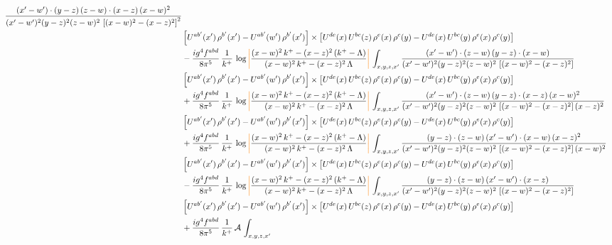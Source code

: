 \documentclass[9pt]{article}
\numberwithin{equation}{section}
\begin{document}
\begin{align}
\frac{(x'-w')\cdot(y-z)\,(z-w)\cdot(x-z)\,(x-w)^{2}}{(x'-w')^{2}(y-z)^{2}(z-w)^{2}\,\left[(x-w)^{2}-(x-z)^{2}\right]^{2}}\notag \\ 
&\left[U^{ab'}(x')\,\rho^{b'}(x')-U^{ab'}(w')\, \rho^{b'}(x')\right]\times \left[U^{de}(x)\,U^{bc}(z)\, \rho^{e}(x)\,\rho^{c}(y)-U^{de}(x)\,U^{bc}(y)\,\rho^{e}(x)\,\rho^{c}(y)\right]\notag \\ & -\frac{ig^{4}f^{abd}}{8\pi^{5}}\,\frac{1}{k^{+}}\,\log{\textcolor{orange}{\left|\textcolor{black}{\frac{(x-w)^{2}\,k^{+}-(x-z)^{2}\,(k^{+}-\Lambda)}{(x-w)^{2}\,k^{+}-(x-z)^{2}\,\Lambda}}\right|}}\,\int_{x,y,z,x'}
\frac{(x'-w')\cdot(z-w)\,(y-z)\cdot(x-w)}{(x'-w')^{2}(y-z)^{2}(z-w)^{2}\,\left[(x-w)^{2}-(x-z)^{2}\right]}\notag \\ & \left[U^{ab'}(x')\,\rho^{b'}(x')-U^{ab'}(w')\, \rho^{b'}(x')\right]\times \left[U^{de}(x)\,U^{bc}(z)\, \rho^{e}(x)\,\rho^{c}(y)-U^{de}(x)\,U^{bc}(y)\,\rho^{e}(x)\,\rho^{c}(y)\right]\notag \\ &  +\frac{ig^{4}f^{abd}}{8\pi^{5}}\,\frac{1}{k^{+}}\,\log{\textcolor{orange}{\left|\textcolor{black}{\frac{(x-w)^{2}\,k^{+}-(x-z)^{2}\,(k^{+}-\Lambda)}{(x-w)^{2}\,k^{+}-(x-z)^{2}\,\Lambda}}\right|}}\,\int_{x,y,z,x'}
\frac{(x'-w')\cdot(z-w)\,(y-z)\cdot(x-z)\,(x-w)^{2}}{(x'-w')^{2}(y-z)^{2}(z-w)^{2}\,\left[(x-w)^{2}-(x-z)^{2}\right](x-z)^{2}}\notag \\ & \left[U^{ab'}(x')\,\rho^{b'}(x')-U^{ab'}(w')\, \rho^{b'}(x')\right]\times \left[U^{de}(x)\,U^{bc}(z)\, \rho^{e}(x)\,\rho^{c}(y)-U^{de}(x)\,U^{bc}(y)\,\rho^{e}(x)\,\rho^{c}(y)\right]\notag \\ & +\frac{ig^{4}f^{abd}}{8\pi^{5}}\,\frac{1}{k^{+}}\,\log{\textcolor{orange}{\left|\textcolor{black}{\frac{(x-w)^{2}\,k^{+}-(x-z)^{2}\,(k^{+}-\Lambda)}{(x-w)^{2}\,k^{+}-(x-z)^{2}\,\Lambda}}\right|}}\,\int_{x,y,z,x'}
\frac{(y-z)\cdot(z-w)\,(x'-w')\cdot(x-w)\,(x-z)^{2}}{(x'-w')^{2}(y-z)^{2}(z-w)^{2}\,\left[(x-w)^{2}-(x-z)^{2}\right](x-w)^{2}}\notag \\ 
& \left[U^{ab'}(x')\,\rho^{b'}(x')-U^{ab'}(w')\, \rho^{b'}(x')\right]\times \left[U^{de}(x)\,U^{bc}(z)\, \rho^{e}(x)\,\rho^{c}(y)-U^{de}(x)\,U^{bc}(y)\,\rho^{e}(x)\,\rho^{c}(y)\right]\notag \\ & -\frac{ig^{4}f^{abd}}{8\pi^{5}}\,\frac{1}{k^{+}}\,\log{\textcolor{orange}{\left|\textcolor{black}{\frac{(x-w)^{2}\,k^{+}-(x-z)^{2}\,(k^{+}-\Lambda)}{(x-w)^{2}\,k^{+}-(x-z)^{2}\,\Lambda}}\right|}}\,\int_{x,y,z,x'}
\frac{(y-z)\cdot(z-w)\,(x'-w')\cdot(x-z)}{(x'-w')^{2}(y-z)^{2}(z-w)^{2}\,\left[(x-w)^{2}-(x-z)^{2}\right]}\notag \\ & \left[U^{ab'}(x')\,\rho^{b'}(x')-U^{ab'}(w')\, \rho^{b'}(x')\right]\times \left[U^{de}(x)\,U^{bc}(z)\, \rho^{e}(x)\,\rho^{c}(y)-U^{de}(x)\,U^{bc}(y)\,\rho^{e}(x)\,\rho^{c}(y)\right]\notag \\ & +\frac{ig^{4}f^{abd}}{8\pi^{5}}\,\frac{1}{k^{+}}\,\mathcal{A}\,\int_{x,y,z,x'}

\end{align}
\end{document}
